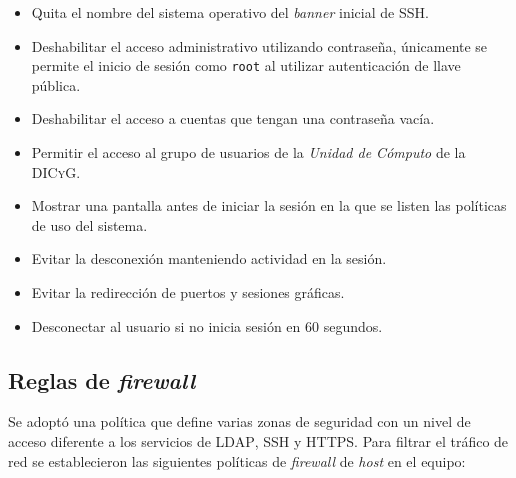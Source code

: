 \begin{itemize}
  \item Quita el nombre del sistema operativo del \textit{banner} inicial de \textsc{\gls{SSH}}.
  \item Deshabilitar el acceso administrativo utilizando contrase\~{n}a, \'{u}nicamente se permite el inicio de sesi\'{o}n como \texttt{\gls{root}} al utilizar autenticaci\'{o}n de llave p\'{u}blica.
  \item Deshabilitar el acceso a cuentas que tengan una contrase\~{n}a vac\'{i}a.
  \item Permitir el acceso al grupo de usuarios de la \emph{Unidad de C\'{o}mputo} de la \textsc{DICyG}.
  \item  Mostrar una pantalla antes de iniciar la sesi\'{o}n en la que se listen las pol\'{i}ticas de uso del sistema.
  \item Evitar la desconexi\'{o}n manteniendo actividad en la sesi\'{o}n.
  \item Evitar la redirecci\'{o}n de puertos y sesiones gr\'{a}ficas.
  \item Desconectar al usuario si no inicia sesi\'{o}n en 60 segundos.
\end{itemize}

      \subsection {Reglas de \textit{firewall}}
      \label{subsec:fw-rules}

Se adopt\'{o} una pol\'{i}tica que define varias zonas de seguridad con un nivel de acceso diferente a los servicios de \textsc{\gls{LDAP}}, \textsc{\gls{SSH}} y \textsc{\gls{HTTPS}}. Para filtrar el tr\'{a}fico de red se establecieron las siguientes pol\'{i}ticas de \emph{\gls{firewall}} de \emph{\gls{host}} en el equipo:

